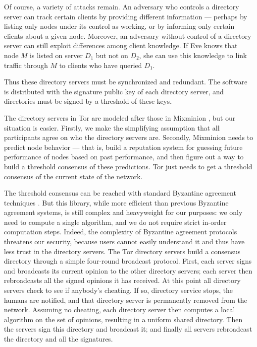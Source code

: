 \documentclass[times,10pt,twocolumn]{article}
\begin{document}
Of course, a variety of attacks remain. An adversary who controls a
directory server can track certain clients by providing different
information --- perhaps by listing only nodes under its control
as working, or by informing only certain clients about a given
node. Moreover, an adversary without control of a directory server can
still exploit differences among client knowledge. If Eve knows that
node $M$ is listed on server $D_1$ but not on $D_2$, she can use this
knowledge to link traffic through $M$ to clients who have queried $D_1$.

Thus these directory servers must be synchronized and redundant. The
software is distributed with the signature public key of each directory
server, and directories must be signed by a threshold of these keys.

The directory servers in Tor are modeled after those in Mixminion
\cite{minion-design}, but our situation is easier. Firstly, we make the
simplifying assumption that all participants agree on who the directory
servers are. Secondly, Mixminion needs to predict node behavior ---
that is, build a reputation system for guessing future performance of
nodes based on past performance, and then figure out a way to build
a threshold consensus of these predictions. Tor just needs to get a
threshold consensus of the current state of the network.

The threshold consensus can be reached with standard Byzantine agreement
techniques \cite{castro-liskov}.
But this library, while more efficient than previous Byzantine agreement
systems, is still complex and heavyweight for our purposes: we only need
to compute a single algorithm, and we do not require strict in-order
computation steps. Indeed, the complexity of Byzantine agreement protocols
threatens our security, because users cannot easily understand it and
thus have less trust in the directory servers. The Tor directory servers
build a consensus directory
through a simple four-round broadcast protocol. First, each server signs
and broadcasts its current opinion to the other directory servers; each
server then rebroadcasts all the signed opinions it has received. At this
point all directory servers check to see if anybody's cheating. If so,
directory service stops, the humans are notified, and that directory
server is permanently removed from the network. Assuming no cheating,
each directory server then computes a local algorithm on the set of
opinions, resulting in a uniform shared directory. Then the servers sign
this directory and broadcast it; and finally all servers rebroadcast
the directory and all the signatures.
\end{document}
